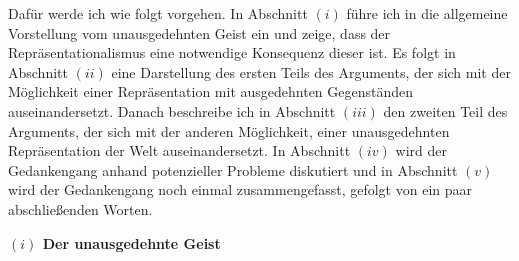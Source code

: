 \documentclass[a4paper, 12pt]{article}
\begin{document}
\begin{onehalfspace}
\vspace{3mm}

Dafür werde ich wie folgt vorgehen. In Abschnitt $(i)$ führe ich in die allgemeine Vorstellung vom unausgedehnten Geist ein und zeige, dass der Repräsentationalismus eine notwendige Konsequenz dieser ist. Es folgt in Abschnitt $(ii)$ eine Darstellung des ersten Teils des Arguments, der sich mit der Möglichkeit einer Repräsentation mit ausgedehnten Gegenständen auseinandersetzt. Danach beschreibe ich in Abschnitt $(iii)$ den zweiten Teil des Arguments, der sich mit der anderen Möglichkeit, einer unausgedehnten Repräsentation der Welt auseinandersetzt. In Abschnitt $(iv)$ wird der Gedankengang anhand potenzieller Probleme diskutiert und in Abschnitt $(v)$ wird der Gedankengang noch einmal zusammengefasst, gefolgt von ein paar abschließenden Worten.


\vspace{5mm}
\noindent\textbf{$(i)$ Der unausgedehnte Geist}



\end{onehalfspace}
\end{document}
